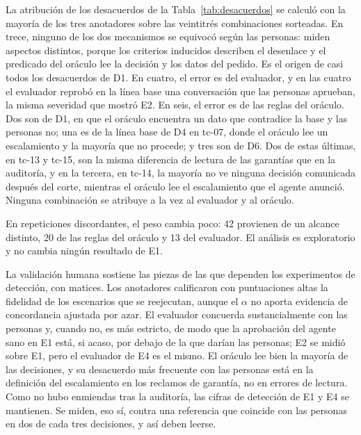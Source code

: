 La atribución de los desacuerdos de la Tabla~\ref{tab:desacuerdos} se calculó con la mayoría de los tres anotadores sobre las veintitrés combinaciones sorteadas. En trece, ninguno de los dos mecanismos se equivocó según las personas: miden aspectos distintos, porque los criterios inducidos describen el desenlace y el predicado del oráculo lee la decisión y los datos del pedido. Es el origen de casi todos los desacuerdos de D1. En cuatro, el error es del evaluador, y en las cuatro el evaluador reprobó en la línea base una conversación que las personas aprueban, la misma severidad que mostró E2. En seis, el error es de las reglas del oráculo. Dos son de D1, en que el oráculo encuentra un dato que contradice la base y las personas no; una es de la línea base de D4 en tc-07, donde el oráculo lee un escalamiento y la mayoría que no procede; y tres son de D6. Dos de estas últimas, en tc-13 y tc-15, son la misma diferencia de lectura de las garantías que en la auditoría, y en la tercera, en tc-14, la mayoría no ve ninguna decisión comunicada después del corte, mientras el oráculo lee el escalamiento que el agente anunció. Ninguna combinación se atribuye a la vez al evaluador y al oráculo.
\par
En repeticiones discordantes, el peso cambia poco: 42 provienen de un alcance distinto, 20 de las reglas del oráculo y 13 del evaluador. El análisis es exploratorio y no cambia ningún resultado de E1.
\par

La validación humana sostiene las piezas de las que dependen los experimentos de detección, con matices. Los anotadores calificaron con puntuaciones altas la fidelidad de los escenarios que se reejecutan, aunque el $\alpha$ no aporta evidencia de concordancia ajustada por azar. El evaluador concuerda sustancialmente con las personas y, cuando no, es más estricto, de modo que la aprobación del agente sano en E1 está, si acaso, por debajo de la que darían las personas; E2 se midió sobre E1, pero el evaluador de E4 es el mismo. El oráculo lee bien la mayoría de las decisiones, y su desacuerdo más frecuente con las personas está en la definición del escalamiento en los reclamos de garantía, no en errores de lectura. Como no hubo enmiendas tras la auditoría, las cifras de detección de E1 y E4 se mantienen. Se miden, eso sí, contra una referencia que coincide con las personas en dos de cada tres decisiones, y así deben leerse.
\par
\endgroup
